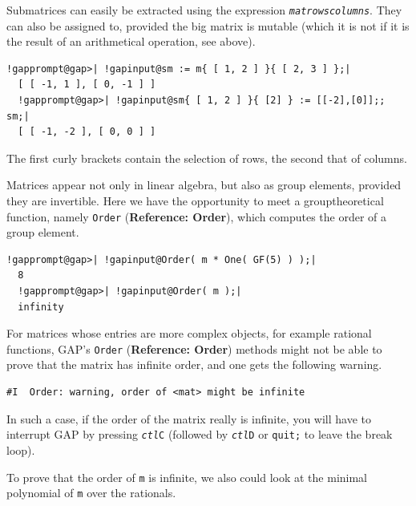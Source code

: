 \documentclass[a4paper,11pt]{report}
\begin{document}
{{ Submatrices can easily be extracted using the expression \texttt{\mbox{\texttt{\mdseries\slshape mat}}\texttt{}\mbox{\texttt{\mdseries\slshape rows}}\texttt{}\texttt{}\mbox{\texttt{\mdseries\slshape columns}}\texttt{}}. They can also be assigned to, provided the big matrix is mutable (which it
is not if it is the result of an arithmetical operation, see above). 

 
\begin{Verbatim}[commandchars=!@|,fontsize=\small,frame=single,label=Example]
  !gapprompt@gap>| !gapinput@sm := m{ [ 1, 2 ] }{ [ 2, 3 ] };|
  [ [ -1, 1 ], [ 0, -1 ] ]
  !gapprompt@gap>| !gapinput@sm{ [ 1, 2 ] }{ [2] } := [[-2],[0]];;  sm;|
  [ [ -1, -2 ], [ 0, 0 ] ]
\end{Verbatim}
 

 The first curly brackets contain the selection of rows, the second that of
columns. 

 Matrices appear not only in linear algebra, but also as group elements,
provided they are invertible. Here we have the opportunity to meet a
group\texttt{}theoretical function, namely \texttt{Order} (\textbf{Reference: Order}), which computes the order of a group element. 

 
\begin{Verbatim}[commandchars=!@|,fontsize=\small,frame=single,label=Example]
  !gapprompt@gap>| !gapinput@Order( m * One( GF(5) ) );|
  8
  !gapprompt@gap>| !gapinput@Order( m );|
  infinity
\end{Verbatim}
 

 For matrices whose entries are more complex objects, for example rational
functions, \textsf{GAP}'s \texttt{Order} (\textbf{Reference: Order}) methods might not be able to prove that the matrix has infinite order, and one
gets the following warning. 
\begin{Verbatim}[commandchars=!@|,fontsize=\small,frame=single,label=Example]
  #I  Order: warning, order of <mat> might be infinite
\end{Verbatim}
 In such a case, if the order of the matrix really is infinite, you will have
to interrupt \textsf{GAP} by pressing \texttt{\mbox{\texttt{\mdseries\slshape ctl}}\texttt{}C} (followed by \texttt{\mbox{\texttt{\mdseries\slshape ctl}}\texttt{}D} or \texttt{quit;} to leave the break loop). 

 To prove that the order of \texttt{m} is infinite, we also could look at the minimal polynomial of \texttt{m} over the rationals. 

}}
\end{document}
